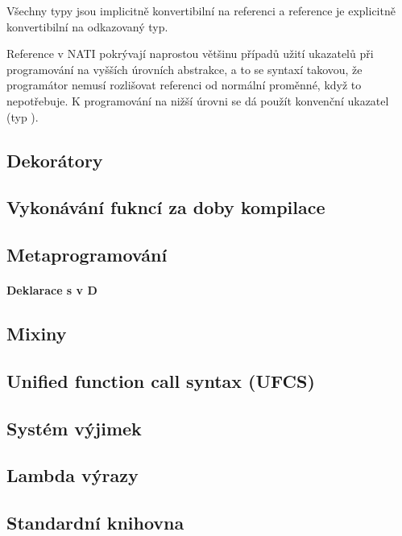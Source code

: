 Všechny typy jsou implicitně konvertibilní na referenci a reference je explicitně konvertibilní na odkazovaný typ.

Reference v NATI pokrývají naprostou většinu případů užití ukazatelů při programování na vyšších úrovních abstrakce, a to se syntaxí takovou, že programátor nemusí rozlišovat referenci od normální proměnné, když to nepotřebuje. K programování na nižší úrovni se dá použít konvenční ukazatel (typ ).

\subsection{Dekorátory}

\subsection{Vykonávání fukncí za doby kompilace}

\subsection{Metaprogramování}

\paragraph{Deklarace s  v D}

\subsection{Mixiny}

\subsection{Unified function call syntax (UFCS)}

\subsection{Systém výjimek}

\subsection{Lambda výrazy}

\subsection{Standardní knihovna}

